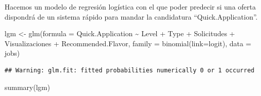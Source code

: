 \documentclass[
]{article}
\newenvironment{Shaded}{\begin{snugshade}}{\end{snugshade}}
\newcommand{\DataTypeTok}[1]{\textcolor[rgb]{0.87,0.87,0.75}{#1}}
\newcommand{\KeywordTok}[1]{\textcolor[rgb]{0.94,0.87,0.69}{#1}}
\newcommand{\NormalTok}[1]{\textcolor[rgb]{0.80,0.80,0.80}{#1}}
\newcommand{\OperatorTok}[1]{\textcolor[rgb]{0.94,0.94,0.82}{#1}}
\newcommand{\StringTok}[1]{\textcolor[rgb]{0.80,0.58,0.58}{#1}}
\begin{document}
Hacemos un modelo de regresión logística con el que poder predecir si
una oferta dispondrá de un sistema rápido para mandar la candidatura
``Quick.Application''.

\begin{Shaded}
\begin{Highlighting}[]
\NormalTok{lgm \textless{}{-}}\StringTok{ }\KeywordTok{glm}\NormalTok{(}\DataTypeTok{formula =}\NormalTok{ Quick.Application }\OperatorTok{\textasciitilde{}}\StringTok{ }\NormalTok{Level }\OperatorTok{+}\StringTok{ }\NormalTok{Type }\OperatorTok{+}\StringTok{ }\NormalTok{Solicitudes }\OperatorTok{+}\StringTok{ }\NormalTok{Visualizaciones }\OperatorTok{+}\StringTok{ }\NormalTok{Recommended.Flavor, }\DataTypeTok{family =} \KeywordTok{binomial}\NormalTok{(}\DataTypeTok{link=}\NormalTok{logit), }\DataTypeTok{data =}\NormalTok{ jobs)}
\end{Highlighting}
\end{Shaded}

\begin{verbatim}
## Warning: glm.fit: fitted probabilities numerically 0 or 1 occurred
\end{verbatim}

\begin{Shaded}
\begin{Highlighting}[]
\KeywordTok{summary}\NormalTok{(lgm)}
\end{Highlighting}
\end{Shaded}
\end{document}
